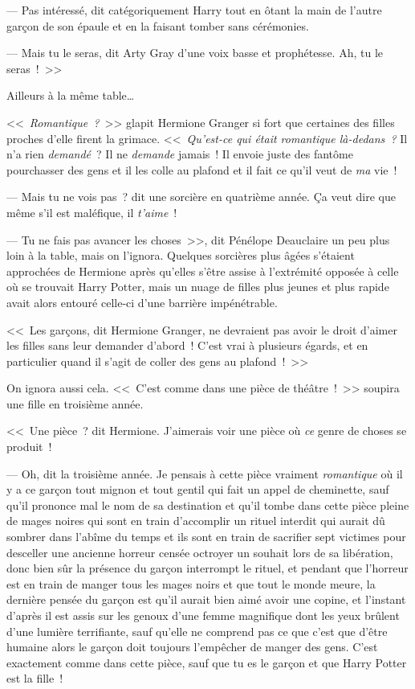--- Pas intéressé, dit catégoriquement Harry tout en ôtant la main de l'autre garçon de son épaule et en la faisant tomber sans cérémonies.

--- Mais tu le seras, dit Arty Gray d'une voix basse et prophétesse. Ah, tu le seras~!~>>

Ailleurs à la même table…

<<~\emph{Romantique~?}~>> glapit Hermione Granger si fort que certaines des filles proches d'elle firent la grimace. <<~\emph{Qu'est-ce qui était romantique là-dedans~?} Il n'a rien \emph{demandé}~? Il ne \emph{demande} jamais~! Il envoie juste des fantôme pourchasser des gens et il les colle au plafond et il fait ce qu'il veut de \emph{ma} vie~!

--- Mais tu ne vois pas~? dit une sorcière en quatrième année. Ça veut dire que même s'il est maléfique, il \emph{t'aime}~!

--- Tu ne fais pas avancer les choses~>>, dit Pénélope Deauclaire un peu plus loin à la table, mais on l'ignora. Quelques sorcières plus âgées s'étaient approchées de Hermione après qu'elles s'être assise à l'extrémité opposée à celle où se trouvait Harry Potter, mais un nuage de filles plus jeunes et plus rapide avait alors entouré celle-ci d'une barrière impénétrable.

<<~Les garçons, dit Hermione Granger, ne devraient pas avoir le droit d'aimer les filles sans leur demander d'abord~! C'est vrai à plusieurs égards, et en particulier quand il s'agit de coller des gens au plafond~!~>>

On ignora aussi cela. <<~C'est comme dans une pièce de théâtre~!~>> soupira une fille en troisième année.

<<~Une pièce~? dit Hermione. J'aimerais voir une pièce où \emph{ce} genre de choses se produit~!

--- Oh, dit la troisième année. Je pensais à cette pièce vraiment \emph{romantique} où il y a ce garçon tout mignon et tout gentil qui fait un appel de cheminette, sauf qu'il prononce mal le nom de sa destination et qu'il tombe dans cette pièce pleine de mages noires qui sont en train d'accomplir un rituel interdit qui aurait dû sombrer dans l'abîme du temps et ils sont en train de sacrifier sept victimes pour desceller une ancienne horreur censée octroyer un souhait lors de sa libération, donc bien sûr la présence du garçon interrompt le rituel, et pendant que l'horreur est en train de manger tous les mages noirs et que tout le monde meure, la dernière pensée du garçon est qu'il aurait bien aimé avoir une copine, et l'instant d'après il est assis sur les genoux d'une femme magnifique dont les yeux brûlent d'une lumière terrifiante, sauf qu'elle ne comprend pas ce que c'est que d'être humaine alors le garçon doit toujours l'empêcher de manger des gens. C'est exactement comme dans cette pièce, sauf que tu es le garçon et que Harry Potter est la fille~!

